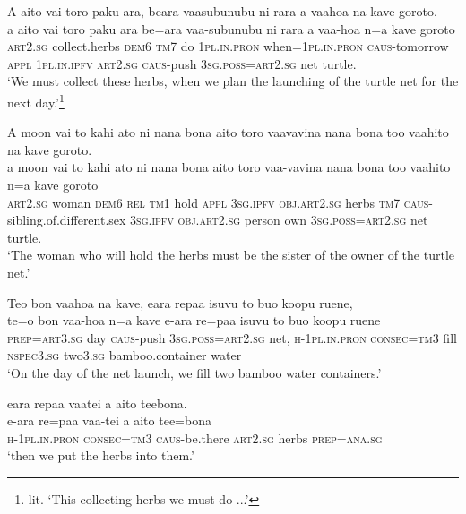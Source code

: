 \ea\label{ex:text21-5}
A aito vai toro paku ara, beara vaasubunubu ni rara a vaahoa na kave goroto.\\
\gll a	aito	vai	toro	paku	ara	be=ara	vaa-subunubu	ni	rara	a	vaa-hoa	n=a	kave	goroto\\
     \textsc{art}2.\textsc{sg}	collect.herbs	\textsc{dem}6	\textsc{tm}7	do	1\textsc{pl}.\textsc{in}.\textsc{pron}	when=1\textsc{pl}.\textsc{in}.\textsc{pron}	\textsc{caus}-tomorrow	\textsc{appl}	1\textsc{pl}.\textsc{in}.\textsc{ipfv}	\textsc{art}2.\textsc{sg}	\textsc{caus}-push	3\textsc{sg}.\textsc{poss}=\textsc{art}2.\textsc{sg}	net	turtle.\\
\glt `We must collect these herbs, when we plan the launching of the turtle net for the next day.'\footnote{lit. `This collecting herbs we must do ...'}
\z

\ea\label{ex:text21-6}
A moon vai to kahi ato ni nana bona aito toro vaavavina nana bona too vaahito na kave goroto.\\
\gll a	moon	vai	to	kahi	ato	ni	nana	bona	aito	toro	vaa-vavina	nana	bona	too	vaahito	n=a	kave	goroto\\
     \textsc{art}2.\textsc{sg}	woman	\textsc{dem}6	\textsc{rel}	\textsc{tm}1	hold	\textsc{appl}	3\textsc{sg}.\textsc{ipfv}	\textsc{obj}.\textsc{art}2.\textsc{sg}	herbs	\textsc{tm}7	\textsc{caus}-sibling.of.different.sex	3\textsc{sg}.\textsc{ipfv}	\textsc{obj}.\textsc{art}2.\textsc{sg}	person	own	3\textsc{sg}.\textsc{poss}=\textsc{art}2.\textsc{sg}	net	turtle.\\
\glt `The woman who will hold the herbs must be the sister of the owner of the turtle net.'
\z

\ea\label{ex:text21-7}
Teo bon vaahoa na kave, eara repaa isuvu to buo koopu ruene,\\
\gll te=o	bon	vaa-hoa	n=a	kave	e-ara	re=paa	isuvu	to	buo	koopu	ruene\\
     \textsc{prep}=\textsc{art}3.\textsc{sg}	day	\textsc{caus}-push	3\textsc{sg}.\textsc{poss}=\textsc{art}2.\textsc{sg}	net,	\textsc{h}-1\textsc{pl}.\textsc{in}.\textsc{pron}	\textsc{consec}=\textsc{tm}3	fill	\textsc{nspec}3.\textsc{sg}	two3.\textsc{sg}	bamboo.container	water\\
\glt `On the day of the net launch, we fill two bamboo water containers.'
\z

\ea\label{ex:text21-8}
eara repaa vaatei a aito teebona.\\
\gll e-ara	re=paa	vaa-tei	a	aito	tee=bona\\
     \textsc{h}-1\textsc{pl}.\textsc{in}.\textsc{pron}	\textsc{consec}=\textsc{tm}3	\textsc{caus}-be.there	\textsc{art}2.\textsc{sg}	herbs	\textsc{prep}=\textsc{ana}.\textsc{sg}\\
\glt `then we put the herbs into them.'
\z

